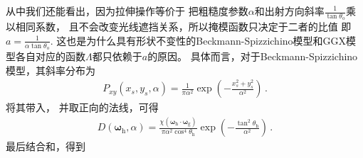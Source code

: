 从中我们还能看出，因为拉伸操作等价于
把粗糙度参数$\alpha$和出射方向斜率$\displaystyle\frac{1}{\tan\theta_{\mathrm{o}}}$乘以相同系数，
且不会改变光线遮挡关系，所以掩模函数只决定于二者的比值
即$\displaystyle a=\frac{1}{\alpha\tan\theta_{\mathrm{o}}}$.
这也是为什么具有形状不变性的Beckmann-Spizzichino模型和GGX模型各自对应的函数$\Lambda$都只依赖于$a$的原因。
具体而言，对于Beckmann-Spizzichino模型\citep{1987BeckmannSpizzichino}，其斜率分布为
\begin{align}
    P_{xy}(x_s,y_s,\alpha)=\frac{1}{\pi\alpha^2}\exp\left(-\frac{x_s^2+y_s^2}{\alpha^2}\right)\, .
\end{align}
将其带入，
并取正向的法线，可得
\begin{align}
    D({\bm\omega}_{\mathrm{h}},\alpha)=\frac{\chi({\bm\omega}_{\mathrm{h}}\cdot{\bm\omega}_{\mathrm{g}})}
    {\pi\alpha^2\cos^4\theta_{\mathrm{h}}}\exp\left(-\frac{\tan^2\theta_{\mathrm{h}}}{\alpha^2}\right)\, .
\end{align}
最后结合和，得到
